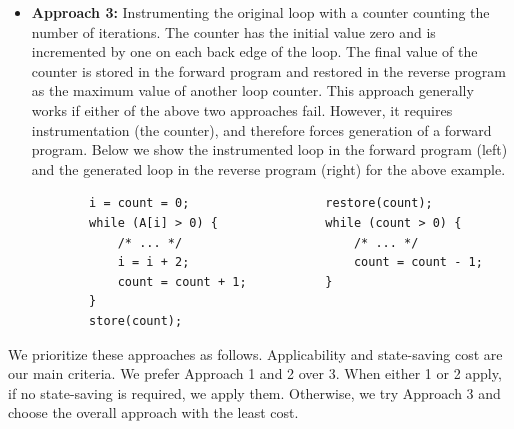 \documentclass[12pt]{gatech-thesis}
\begin{document}
\begin{itemize}
\item \textbf{Approach 3:} Instrumenting the original loop with a counter counting the number of iterations. The counter has the initial value zero and is incremented by one on each back edge of the loop.
The final value of the counter is stored in the forward program and restored in the reverse program as the maximum value of another loop counter.
This approach generally works if either of the above two approaches fail.
However, it requires instrumentation (the counter), and therefore forces generation of a forward program. Below we show the instrumented loop in the forward program (left) and the generated loop in the reverse program (right) for the above example.


\small
\begin{verbatim}
        i = count = 0;                   restore(count);
        while (A[i] > 0) {               while (count > 0) {
            /* ... */                        /* ... */
            i = i + 2;                       count = count - 1;
            count = count + 1;           }
        }                             
        store(count);
\end{verbatim}
\normalsize



\end{itemize}

We prioritize these approaches as follows.
Applicability and state-saving cost are our main criteria.
We prefer Approach 1 and 2 over 3.
When either 1 or 2 apply, if no state-saving is required, we apply them.
Otherwise, we try Approach 3 and choose the overall approach with the least cost.

\vspace{3mm}
\end{document}

